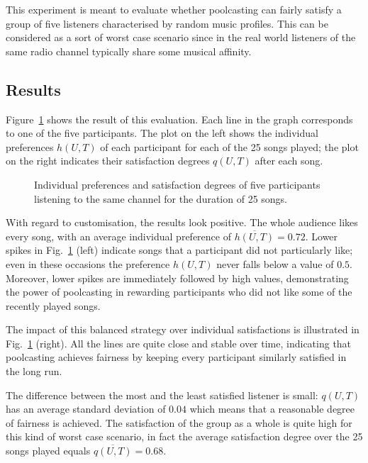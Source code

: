 This experiment is meant to evaluate whether poolcasting can fairly satisfy a group of five listeners characterised by random music profiles.
This can be considered as a sort of worst case scenario since in the real world listeners of the same radio channel typically share some musical affinity.

\subsection{Results} %
\label{sub:initial_results}

Figure~\ref{fig:default} shows the result of this evaluation.
Each line in the graph corresponds to one of the five participants. 
The plot on the left shows the individual preferences $h(U,T)$ of each participant for each of the 25 songs played; the plot on the right indicates their satisfaction degrees $q(U,T)$ after each song.
%
\begin{figure}[bthp]
\centering \setlength{\abovecaptionskip}{3pt}
\caption{Individual preferences and satisfaction degrees of five participants listening to the same channel for the duration of 25 songs.}
\label{fig:default}
\end{figure}

With regard to customisation, the results look positive.
The whole audience likes every song, %
with an average individual preference of
$\overline{h(U,T)} = 0.72$.
%
Lower spikes in Fig.~\ref{fig:default} (left) indicate songs that a participant did not particularly like; even in these occasions the preference $h(U,T)$ never falls below a value of $0.5$.
Moreover, lower spikes are immediately followed by high values, demonstrating the power of poolcasting in rewarding participants who did not like some of the recently played songs.

The impact of this balanced strategy over individual satisfactions is illustrated in Fig.~\ref{fig:default} (right).
All the lines are quite close and stable over time, indicating that poolcasting achieves fairness by keeping every participant similarly satisfied in the long run.


The difference between the most and the least satisfied listener is small: $q(U,T)$ has an average standard deviation of $0.04$ which means that a reasonable degree of fairness is achieved.
The satisfaction of the group as a whole is quite high for this kind of worst case scenario, in fact the average satisfaction degree over the 25 songs played equals $\overline{q(U,T)} = 0.68$.


